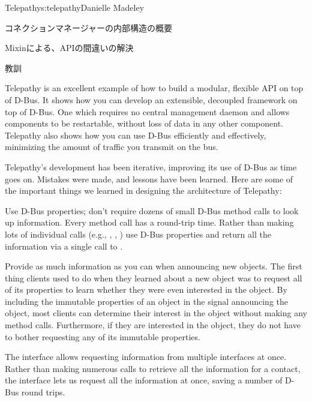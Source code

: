 \begin{aosachapter}{Telepathy}{s:telepathy}{Danielle Madeley}
\begin{aosasect1}{コネクションマネージャーの内部構造の概要}
\begin{aosabox}{Mixinによる、APIの間違いの解決}
\end{aosabox}

\end{aosasect1}

\begin{aosasect1}{教訓}

Telepathy is an excellent example of how to build a modular, flexible
API on top of D-Bus. It shows how you can develop an extensible,
decoupled framework on top of D-Bus. One which requires no central
management daemon and allows components to be restartable, without
loss of data in any other component.  Telepathy also shows how you can
use D-Bus efficiently and effectively, minimizing the amount of
traffic you transmit on the bus.

Telepathy's development has been iterative, improving its use of D-Bus
as time goes on. Mistakes were made, and lessons have been learned.
Here are some of the important things we learned in designing the
architecture of Telepathy:

\begin{aosadescription}

  \item{Use D-Bus properties; don't require dozens of small D-Bus
    method calls to look up information.}  Every method call has a
    round-trip time. Rather than making lots of individual calls
    (e.g., , ,
    ) use D-Bus properties and return all the
    information via a single call to .

  \item{Provide as much information as you can when announcing new
    objects.}  The first thing clients used to do when they learned
    about a new object was to request all of its properties to learn
    whether they were even interested in the object. By including the
    immutable properties of an object in the signal announcing the
    object, most clients can determine their interest in the object
    without making any method calls. Furthermore, if they are
    interested in the object, they do not have to bother requesting
    any of its immutable properties.

  \item{The  interface allows requesting information
    from multiple interfaces at once.}  Rather than making numerous
     calls to retrieve all the information for a contact,
    the  interface lets us request all the information
    at once, saving a number of D-Bus round trips.


\end{aosadescription}
\end{aosasect1}
\end{aosachapter}
